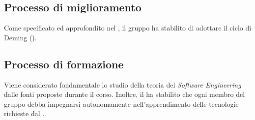 \subsection{Processo di miglioramento}

Come specificato ed approfondito nel \PianoDiQualifica, il gruppo ha stabilito di adottare il ciclo di Deming ().

\subsection{Processo di formazione}

Viene considerato fondamentale lo studio della teoria del \textit{Software Engineering} dalle fonti proposte durante il corso.
Inoltre, il  ha stabilito che ogni membro del gruppo debba impegnarsi autonomamente nell'apprendimento delle tecnologie richieste dal .
